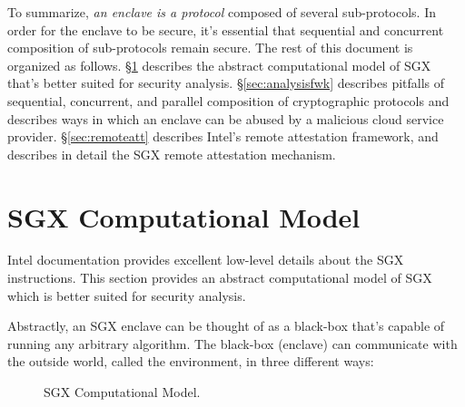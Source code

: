 \documentclass[letterpaper]{article}
\newcommand{\secref}[1]{\S\ref{#1}}
\newcommand{\env}{\textsf{environment}}
\begin{document}
  To summarize, \textit{an enclave is a protocol} composed of several
  sub-protocols. In order for the enclave to be secure, it's essential
  that sequential and concurrent composition of sub-protocols remain
  secure. The rest of this document is organized as follows.
  \secref{sec:model} describes the abstract computational model of SGX
  that's better suited for security analysis. \secref{sec:analysisfwk}
  describes pitfalls of sequential, concurrent, and parallel
  composition of cryptographic protocols and describes ways in which
  an enclave can be abused by a malicious cloud service
  provider. \secref{sec:remoteatt} describes Intel's remote
  attestation framework, and describes in detail the SGX remote
  attestation mechanism.

  \section{SGX Computational Model}
  \label{sec:model}
  Intel documentation\cite{intelsdm} provides excellent low-level
  details about the SGX instructions. This section provides an
  abstract computational model of SGX which is better suited for
  security analysis.

  Abstractly, an SGX enclave can be thought of as a black-box that's
  capable of running any arbitrary algorithm. The black-box (enclave)
  can communicate with the outside world, called the \env, in three
  different ways:

  \begin{figure}[h]
  \centering 
  \caption{SGX Computational Model.}
  \label{fig:model}
  \end{figure}
\end{document}
